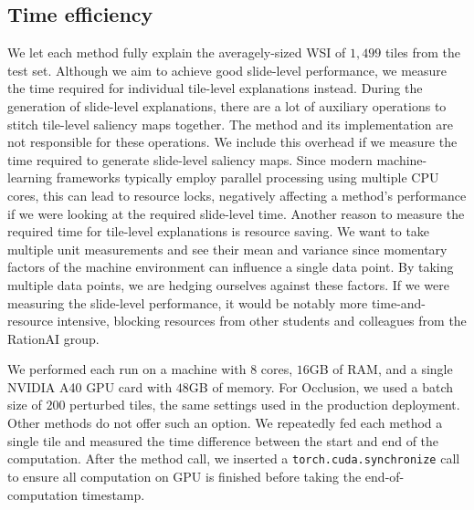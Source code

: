 \subsection*{Time efficiency}

 We let each method fully explain the averagely-sized WSI of $1,499$ tiles from the test set.
 Although we aim to achieve good slide-level performance, we measure the time required for individual tile-level explanations instead.
 During the generation of slide-level explanations, there are a lot of auxiliary operations to stitch tile-level saliency maps together.
 The method and its implementation are not responsible for these operations.
 We include this overhead if we measure the time required to generate slide-level saliency maps.
 Since modern machine-learning frameworks typically employ parallel processing using multiple CPU cores, this can lead to resource locks, negatively affecting a method's performance if we were looking at the required slide-level time.
 Another reason to measure the required time for tile-level explanations is resource saving.
 We want to take multiple unit measurements and see their mean and variance since momentary factors of the machine environment can influence a single data point. 
 By taking multiple data points, we are hedging ourselves against these factors.
 If we were measuring the slide-level performance, it would be notably more time-and-resource intensive, blocking resources from other students and colleagues from the RationAI group.

 We performed each run on a machine with $8$ cores, $16$GB of RAM, and a single NVIDIA A40 GPU card with $48$GB of memory.
 For Occlusion, we used a batch size of $200$ perturbed tiles, the same settings used in the production deployment.
 Other methods do not offer such an option. We repeatedly fed each method a single tile and measured the time difference between the start and end of the computation.
 After the method call, we inserted a \texttt{torch.cuda.synchronize} call to ensure all computation on GPU is finished before taking the end-of-computation timestamp.

